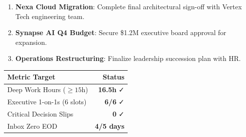 \documentclass[10pt, landscape]{article}
\begin{document}
\begin{minipage}[t]{0.26\linewidth}

  \begin{tcolorbox}[execbox, title={\faBullseye~ WEEKLY STRATEGIC OUTCOMES}]
    \begin{enumerate}[leftmargin=12pt, label=\bfseries\arabic*., itemsep=2pt, topsep=1pt]
      \footnotesize
      \item \textbf{Nexa Cloud Migration}: Complete final architectural sign-off with Vertex Tech engineering team.
      \item \textbf{Synapse AI Q4 Budget}: Secure \$1.2M executive board approval for expansion.
      \item \textbf{Operations Restructuring}: Finalize leadership succession plan with HR.
    \end{enumerate}
  \end{tcolorbox}

  \vspace{3pt}

  \begin{tcolorbox}[lightbox, title={\faChartLine~ KEY PERFORMANCE INDICATORS}]
    \small
    \begin{tabularx}{\linewidth}{X r}
      \hline
      \textbf{Metric Target} & \textbf{Status} \\
      \hline
      Deep Work Hours ($\ge 15$h) & \textbf{16.5h} \color{ExecTeal}\faCheck \\
      Executive 1-on-1s (6 slots) & \textbf{6/6} \color{ExecTeal}\faCheck \\
      Critical Decision Slips & \textbf{0} \color{ExecTeal}\faCheck \\
      Inbox Zero EOD & \textbf{4/5 days} \\
      \hline
    \end{tabularx}
  \end{tcolorbox}

  \vspace{3pt}


\end{minipage}
\end{document}
